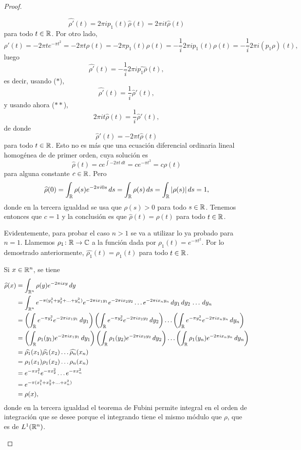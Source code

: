 \documentclass[a4paper, 11pt, oneside]{report}
\begin{document}
\begin{proof}
\begin{enumerate}
  \[\widehat{\rho'}(t) = 2\pi i p_1(t)\widehat{\rho}(t) = 2\pi i t\widehat{\rho}(t) \tag{$\ast\ast$}\]
  para todo $t \in \mathbb R$. Por otro lado,
  \[\rho'(t) = -2\pi t e^{-\pi t^2} = -2\pi t \rho(t) = -2\pi p_1(t)\rho(t) = -\frac{1}{i}2\pi i p_1(t)\rho(t) = -\frac{1}{i}2\pi i (p_1\rho)(t),\]
  luego
  \[\widehat{\rho'}(t) = -\frac{1}{i}2\pi i \widehat{p_1\rho}(t),\]
  es decir, usando ($\ast$),
  \[\widehat{\rho'}(t) = \frac{1}{i}\widehat{\rho}'(t),\]
  y usando ahora ($\ast\ast$),
  \[2\pi i t \widehat{\rho}(t) = \frac{1}{i}\widehat{\rho}'(t),\]
  de donde
  \[\widehat{\rho}'(t) = -2\pi t \widehat{\rho}(t)\]
  para todo $t \in \mathbb R$. Esto no es más que una ecuación diferencial ordinaria lineal homogénea de de primer orden, cuya solución es
  \[\widehat{\rho}(t) = ce^{\int -2\pi t \, dt} = ce^{-\pi t^2} = c\rho(t)\]
  para alguna constante $c \in \mathbb R$. Pero
  \[\widehat{\rho}(0) = \int_{\mathbb R} \rho(s)e^{-2\pi i 0s} \, ds = \int_{\mathbb R} \rho(s) \, ds = \int_{\mathbb R} |\rho(s)| \, ds = 1,\]
  donde en la tercera igualdad se usa que $\rho(s) > 0$ para todo $s \in \mathbb R$. Tenemos entonces que $c = 1$ y la conclusión es que $\widehat{\rho}(t) = \rho(t)$ para todo $t \in \mathbb R$.

  Evidentemente, para probar el caso $n > 1$ se va a utilizar lo ya probado para $n = 1$. Llamemos $\rho_1 \colon \mathbb R \to \mathbb C$ a la función dada por $\rho_1(t) = e^{-\pi t^2}$. Por lo demostrado anteriormente, $\widehat{\rho_1}(t) = \rho_1(t)$ para todo $t \in \mathbb R$.
  
  Si $x \in \mathbb R^n$, se tiene
  \[\begin{aligned}[t]
    \widehat{\rho}(x) &= \int_{\mathbb R^n} \rho(y)e^{-2 \pi i xy} \, dy \\
    &= \int_{\mathbb R^n} e^{-\pi(y_1^2+y_2^2+\mathellipsis+y_n^2)}e^{-2\pi i x_1y_1}e^{-2\pi i x_2y_2} \mathellipsis e^{-2\pi i x_ny_n} \, dy_1 \, dy_2 \, \mathellipsis \, dy_n \\
    &= \left(\int_\mathbb R e^{-\pi y_1^2}e^{-2\pi i x_1y_1} \, dy_1\right)\left(\int_\mathbb R e^{-\pi y_2^2}e^{-2\pi i x_2y_2} \, dy_2\right)\mathellipsis\left(\int_\mathbb R e^{-\pi y_n^2}e^{-2\pi i x_ny_n} \, dy_n\right) \\
    &= \left(\int_\mathbb R \rho_1(y_1)e^{-2\pi i x_1y_1} \, dy_1\right)\left(\int_\mathbb R \rho_1(y_2)e^{-2\pi i x_2y_2} \, dy_2\right)\mathellipsis\left(\int_\mathbb R \rho_1(y_n)e^{-2\pi i x_ny_n} \, dy_n\right) \\
    &= \widehat{\rho_1}(x_1) \widehat{\rho_1}(x_2) \mathellipsis \widehat{\rho_n}(x_n) \\
    &= \rho_1(x_1)\rho_1(x_2) \mathellipsis \rho_n(x_n) \\
    &= e^{-\pi x_1^2}e^{-\pi x_2^2} \mathellipsis e^{-\pi x_n^2} \\
    &= e^{-\pi(x_1^2+x_2^2+\mathellipsis+x_n^2)} \\
    &= \rho(x), 
  \end{aligned}\]
  donde en la tercera igualdad el teorema de Fubini permite integral en el orden de integración que se desee porque el integrando tiene el mismo módulo que $\rho$, que es de $L^1(\mathbb R^n)$. \qedhere
\end{enumerate}
\end{proof}
\end{document}
